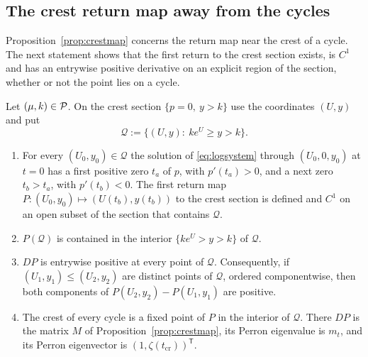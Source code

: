 \subsection{The crest return map away from the cycles}
Proposition~\ref{prop:crestmap} concerns the return map near the crest of a cycle. The next statement shows that the first return to the crest section exists, is $C^1$ and has an entrywise positive derivative on an explicit region of the section, whether or not the point lies on a cycle.
\begin{proposition}\label{prop:crestmonotone}
Let $(\mu,k)\in\mathcal P$. On the crest section $\{p=0,\ y>k\}$ use the coordinates $(U,y)$ and put
\[
\mathcal Q:=\bigl\{(U,y):\ ke^U\ge y>k\bigr\}.
\]
\begin{enumerate}[label=\textup{(\alph*)}]
\item For every $(U_0,y_0)\in\mathcal Q$ the solution of \eqref{eq:logsystem} through $(U_0,0,y_0)$ at $t=0$ has a first positive zero $t_a$ of $p$, with $p'(t_a)>0$, and a next zero $t_b>t_a$, with $p'(t_b)<0$. The first return map $P:(U_0,y_0)\mapsto(U(t_b),y(t_b))$ to the crest section is defined and $C^1$ on an open subset of the section that contains $\mathcal Q$.
\item $P(\mathcal Q)$ is contained in the interior $\{ke^U>y>k\}$ of $\mathcal Q$.
\item $DP$ is entrywise positive at every point of $\mathcal Q$. Consequently, if $(U_1,y_1)\le(U_2,y_2)$ are distinct points of $\mathcal Q$, ordered componentwise, then both components of $P(U_2,y_2)-P(U_1,y_1)$ are positive.
\item The crest of every cycle is a fixed point of $P$ in the interior of $\mathcal Q$. There $DP$ is the matrix $M$ of Proposition~\ref{prop:crestmap}, its Perron eigenvalue is $m_t$, and its Perron eigenvector is $(1,\zeta(t_{\mathrm{cr}}))^{\mathsf T}$.
\end{enumerate}
\end{proposition}
